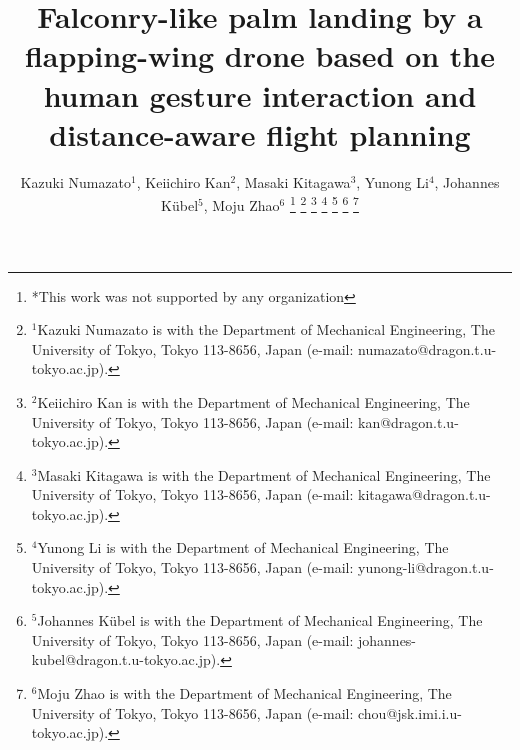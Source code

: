\documentclass[letterpaper, 10 pt, conference]{ieeeconf}  %
\title{\LARGE \bf
Falconry-like palm landing by a flapping-wing drone based on the human gesture interaction and distance-aware flight planning
}
\author{Kazuki Numazato$^{1}$, Keiichiro Kan$^{2}$, Masaki Kitagawa$^{3}$, Yunong Li$^{4}$, Johannes Kübel$^{5}$, Moju Zhao$^{6}$ %
\thanks{*This work was not supported by any organization}%
\thanks{$^{1}$Kazuki Numazato is with the Department of Mechanical Engineering, The University
        of Tokyo, Tokyo 113-8656, Japan (e-mail: numazato@dragon.t.u-tokyo.ac.jp).}%
\thanks{$^{2}$Keiichiro Kan is with the Department of Mechanical Engineering, The University
        of Tokyo, Tokyo 113-8656, Japan (e-mail: kan@dragon.t.u-tokyo.ac.jp).}%
\thanks{$^{3}$Masaki Kitagawa is with the Department of Mechanical Engineering, The University
        of Tokyo, Tokyo 113-8656, Japan (e-mail: kitagawa@dragon.t.u-tokyo.ac.jp).}%
\thanks{$^{4}$Yunong Li is with the Department of Mechanical Engineering, The University
        of Tokyo, Tokyo 113-8656, Japan (e-mail: yunong-li@dragon.t.u-tokyo.ac.jp).}%
\thanks{$^{5}$Johannes Kübel is with the Department of Mechanical Engineering, The University
        of Tokyo, Tokyo 113-8656, Japan (e-mail: johannes-kubel@dragon.t.u-tokyo.ac.jp).}%
\thanks{$^{6}$Moju Zhao is with the Department of Mechanical Engineering, The University
        of Tokyo, Tokyo 113-8656, Japan (e-mail: chou@jsk.imi.i.u-tokyo.ac.jp).}%
}
\begin{document}
\maketitle
\thispagestyle{empty}
\pagestyle{empty}

\begin{abstract}

\end{abstract}








\addtolength{\textheight}{-12cm}   %



\end{document}
